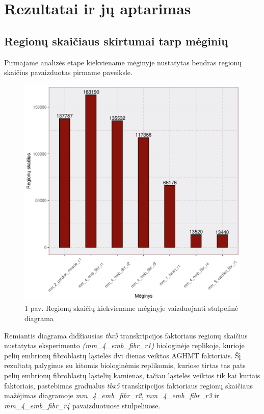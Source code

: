 \documentclass[12pt]{article}
\begin{document}
\newpage


\section{Rezultatai ir jų aptarimas}
\subsection{Regionų skaičiaus skirtumai tarp mėginių}
Pirmajame analizės etape kiekviename mėginyje nustatytas bendras
regionų skaičius pavaizduotas pirmame paveiksle.

\begin{figure}[htb]
    \begin{center}
        \includegraphics[width=0.7\linewidth]{Figures/total_peak_counts.png}
        \caption*{1 pav. Regionų skaičių kiekviename mėginyje
        vaizduojanti stulpelinė diagrama}
    \end{center}
\end{figure}

Remiantis diagrama didžiausias \emph{tbx5} transkripcijos faktoriaus
regionų skaičius nustatytas eksperimento \emph{(mm\_4\_emb\_fibr\_r1)}
biologinėje replikoje, kurioje pelių embrionų fibroblastų ląstelės
dvi dienas veiktos AGHMT faktoriais.
Šį rezultatą palyginus su kitomis biologinėmis replikomis, kuriose
tirtas tas pats pelių embrionų fibroblastų ląstelių kamienas, tačiau
ląstelės veiktos tik kai kuriais faktoriais, pastebimas gradualus
\emph{tbx5} transkripcijos faktoriaus regionų skaičiaus mažėjimas
diagramoje \emph{mm\_4\_emb\_fibr\_r2}, \emph{mm\_4\_emb\_fibr\_r3} ir
\emph{mm\_4\_emb\_fibr\_r4} pavaizduotuose stulpeliuose.
\end{document}
